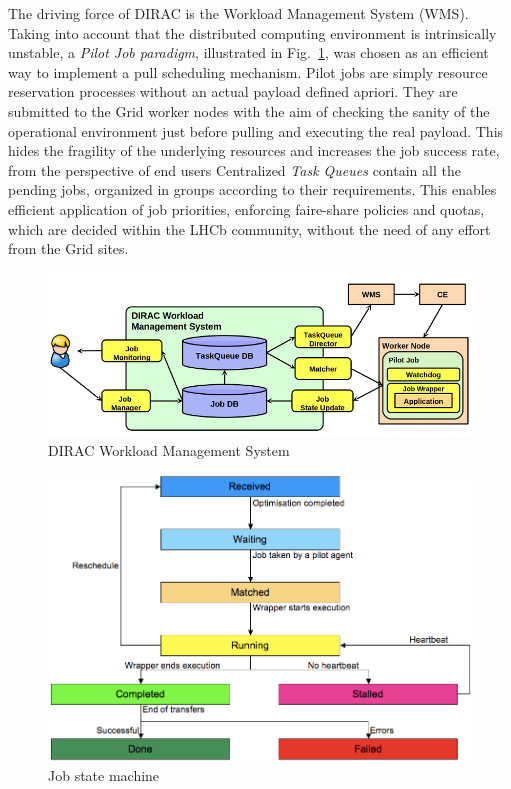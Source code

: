 \documentclass[10pt,conference]{IEEEtran}
\begin{document}
The driving force of DIRAC is the Workload Management System (WMS). Taking into
account that the distributed computing environment is intrinsically unstable, a
\textit{Pilot Job paradigm}, illustrated in Fig.~\ref{fig:DIRAC-WMS}, was chosen as an efficient way to
implement a pull scheduling mechanism.  Pilot jobs are simply resource
reservation processes without an actual payload defined apriori. They are
submitted to the Grid worker nodes with the aim of checking the sanity of the
operational environment just before pulling and executing the real payload. This
hides the fragility of the underlying resources and increases the job success
rate, from the perspective of end users Centralized \textit{Task Queues} contain all the
pending jobs, organized in groups according to their requirements. This enables
efficient application of job priorities, enforcing faire-share policies and
quotas, which are decided within the LHCb community, without the need of any
effort from the Grid sites.  
\begin{figure}[t]
\includegraphics[width=\linewidth,keepaspectratio=true]{./DIRAC_WMS1.png}
\centering
\caption{DIRAC Workload Management System \cite{DIRAC_pilot_WMS}}
\label{fig:DIRAC-WMS}
\end{figure}
 \begin{figure}[b]
\includegraphics[width=\linewidth,keepaspectratio=true]{./dirac-primary-states.png}
\centering
\caption{Job state machine \cite{ProductionShifterGuide}}
\label{fig:DIRAC-job-state-machine}
\end{figure} 
\end{document}
